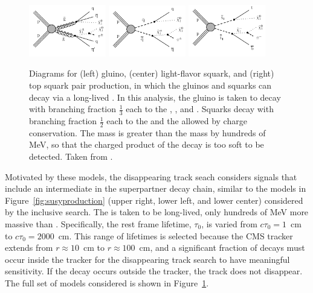   \begin{figure}[htbp]
    \centering
    \includegraphics[width=0.3\textwidth]{figures/MT2_2019/Figure_010-a}
    \includegraphics[width=0.3\textwidth]{figures/MT2_2019/Figure_010-b}
    \includegraphics[width=0.3\textwidth]{figures/MT2_2019/Figure_010-c}
    \caption[Diagrams for (left) gluino, (center) light-flavor squark, and (right) top squark pair production, in which the gluinos and squarks can decay via a long-lived \chargino]{Diagrams for (left) gluino, (center) light-flavor squark, and (right) top squark pair production, in which the gluinos and squarks can decay via a long-lived \chargino. In this analysis, the gluino is taken to decay with branching fraction $\frac{1}{3}$ each to the \lsp, \chim, and \chip. Squarks decay with branching fraction $\frac{1}{2}$ each to the \lsp and the \chargino allowed by charge conservation. The \chargino mass is greater than the \lsp mass by hundreds of MeV, so that the charged product of the \chargino decay is too soft to be detected. Taken from \cite{MT2_2019}.}
    \label{fig:charginodiags}
  \end{figure}
  
  Motivated by these models, the disappearing track seach considers signals that include an intermediate \chargino in the superpartner decay chain, similar to the models in Figure~\ref{fig:susyproduction} (upper right, lower left, and lower center) considered by the inclusive search.
  The \chargino is taken to be long-lived, only hundreds of MeV more massive than \lsp.
  Specifically, the rest frame \chargino lifetime, $\tau_0$, is varied from $c\tau_0 = 1$~cm to $c\tau_0 = 2000$~cm.
  This range of lifetimes is selected because the CMS tracker extends from $r\approx10$~cm to $r\approx 100$~cm, and a significant fraction of \chargino decays must occur inside the tracker for the disappearing track search to have meaningful sensitivity.
  If the decay occurs outside the tracker, the track does not disappear.
  The full set of models considered is shown in Figure~\ref{fig:charginodiags}.
  
